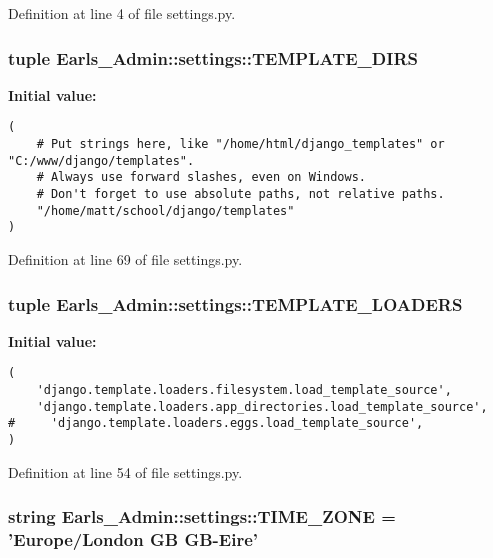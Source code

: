 Definition at line 4 of file settings.py.\hypertarget{namespaceEarls__Admin_1_1settings_b09f5b74aa416bcef75ea632d86ec87f}{
\subsubsection[TEMPLATE\_\-DIRS]{\setlength{\rightskip}{0pt plus 5cm}tuple {\bf Earls\_\-Admin::settings::TEMPLATE\_\-DIRS}}}
\label{namespaceEarls__Admin_1_1settings_b09f5b74aa416bcef75ea632d86ec87f}


\textbf{Initial value:}

\begin{Code}\begin{verbatim}(
    # Put strings here, like "/home/html/django_templates" or "C:/www/django/templates".
    # Always use forward slashes, even on Windows.
    # Don't forget to use absolute paths, not relative paths.
    "/home/matt/school/django/templates"
)
\end{verbatim}
\end{Code}


Definition at line 69 of file settings.py.\hypertarget{namespaceEarls__Admin_1_1settings_0f0437dc7c05b7882493e1f5954d3b1c}{
\subsubsection[TEMPLATE\_\-LOADERS]{\setlength{\rightskip}{0pt plus 5cm}tuple {\bf Earls\_\-Admin::settings::TEMPLATE\_\-LOADERS}}}
\label{namespaceEarls__Admin_1_1settings_0f0437dc7c05b7882493e1f5954d3b1c}


\textbf{Initial value:}

\begin{Code}\begin{verbatim}(
    'django.template.loaders.filesystem.load_template_source',
    'django.template.loaders.app_directories.load_template_source',
#     'django.template.loaders.eggs.load_template_source',
)
\end{verbatim}
\end{Code}


Definition at line 54 of file settings.py.\hypertarget{namespaceEarls__Admin_1_1settings_b4ffd6e2c58ff378c9b65257c9d18e86}{
\subsubsection[TIME\_\-ZONE]{\setlength{\rightskip}{0pt plus 5cm}string {\bf Earls\_\-Admin::settings::TIME\_\-ZONE} = 'Europe/London GB GB-Eire'}}
\label{namespaceEarls__Admin_1_1settings_b4ffd6e2c58ff378c9b65257c9d18e86}




